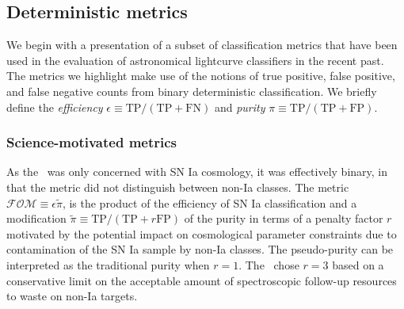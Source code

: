 \subsection{Deterministic metrics}
\label{sec:deterministic}

We begin with a presentation of a subset of classification metrics that have been used in the evaluation of astronomical lightcurve classifiers in the recent past.
The metrics we highlight make use of the notions of true positive, false positive, and false negative counts from binary deterministic classification.
We briefly define the \textit{efficiency} $\epsilon \equiv \mathrm{TP} / (\mathrm{TP} + \mathrm{FN})$ and \textit{purity} $\pi \equiv \mathrm{TP} / (\mathrm{TP} + \mathrm{FP})$.

\subsubsection{Science-motivated metrics}
\label{sec:science}

As the \snphotcc\ was only concerned with SN Ia cosmology, it was effectively binary, in that the metric did not distinguish between non-Ia classes.
The \snphotcc metric $\mathcal{FOM} \equiv \epsilon \tilde{\pi}$,
is the product of the efficiency
of SN Ia classification and a modification $\tilde{\pi} \equiv \mathrm{TP} / (\mathrm{TP} + r \mathrm{FP})$ of the purity in terms of a penalty factor $r$
motivated by the potential impact on cosmological parameter constraints due to contamination of the SN Ia sample by non-Ia classes.
The pseudo-purity can be interpreted as the traditional purity when $r = 1$.
The \snphotcc\ chose $r = 3$ based on a conservative limit on the acceptable amount of spectroscopic follow-up resources to waste on non-Ia targets.


